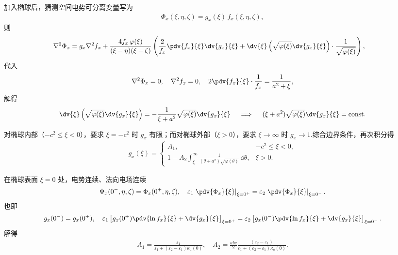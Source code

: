 加入椭球后，猜测空间电势可分离变量写为
\begin{align*}
	\Phi_x(\xi, \eta, \zeta) = g_x(\xi)\, f_x(\xi, \eta, \zeta),
\end{align*}
则
\begin{align*}
	\nabla^2 \Phi_x =\; & g_x \nabla^2 f_x + \frac{4 f_x\, \varphi(\xi)}{(\xi - \eta)(\xi - \zeta)} \left(
	\frac{2}{f_x} \pdv{f_x}{\xi} \dv{g_x}{\xi} +
	\dv{\xi} \left( \sqrt{\varphi(\xi)} \dv{g_x}{\xi} \right) \cdot \frac{1}{\sqrt{\varphi(\xi)}}
	\right),
\end{align*}
代入
\begin{align*}
	\nabla^2 \Phi_x = 0,\quad\nabla^2 f_x = 0,\quad
	2 \pdv{f_x}{\xi} \cdot\frac{1}{f_x} = \frac{1}{a^2 + \xi},
\end{align*}
解得
\begin{align*}
	\dv{\xi} \left( \sqrt{\varphi(\xi)} \dv{g_x}{\xi} \right) = -\frac{1}{\xi + a^2} \sqrt{\varphi(\xi)} \dv{g_x}{\xi}\quad\implies\quad(\xi + a^2) \sqrt{\varphi(\xi)} \dv{g_x}{\xi} = \text{const}.
\end{align*}

对椭球内部（\(-c^2 \leq \xi < 0\)），要求 \(\xi = -c^2\) 时 \(g_x\) 有限；而对椭球外部（\(\xi > 0\)），要求 \(\xi \to \infty\) 时 \(g_x \to 1\).综合边界条件，再次积分得
\begin{align*}
	g_x(\xi) =
	\begin{cases}
		A_1,                                                                                                  & -c^2 \leq \xi < 0, \\
		1 - A_2 \displaystyle\int_{\xi}^{\infty} \frac{1}{(\theta + a^2) \sqrt{\varphi(\theta)}}\, \dd \theta, & \xi > 0.
	\end{cases}
\end{align*}

在椭球表面 \(\xi = 0\) 处，电势连续、法向电场连续
\begin{align*}
	\Phi_x(0^-, \eta, \zeta) = \Phi_x(0^+, \eta, \zeta), \quad
	\varepsilon_1 \left. \pdv{\Phi_x}{\xi} \right|_{\xi = 0^+} = \varepsilon_2 \left. \pdv{\Phi_x}{\xi} \right|_{\xi = 0^-}.
\end{align*}
也即
\begin{align*}
	g_x(0^-) = g_x(0^+), \quad
	\varepsilon_1 \left[ g_x(0^+) \pdv{\ln f_x}{\xi} + \dv{g_x}{\xi} \right]_{\xi = 0^+} =
	\varepsilon_2 \left[ g_x(0^-) \pdv{\ln f_x}{\xi} + \dv{g_x}{\xi} \right]_{\xi = 0^-}.
\end{align*}
解得
\begin{align*}
	A_1 = \frac{\varepsilon_1}{\varepsilon_1 + (\varepsilon_2 - \varepsilon_1) \kappa_a(0)}, \quad
	A_2 = \frac{abc}{2}\frac{(\varepsilon_2 - \varepsilon_1)}{\varepsilon_1 + (\varepsilon_2 - \varepsilon_1)\kappa_a(0)}.
\end{align*}

